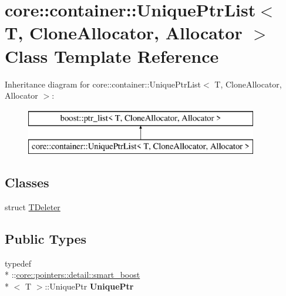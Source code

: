 \hypertarget{classcore_1_1container_1_1_unique_ptr_list}{\section{core\-:\-:container\-:\-:Unique\-Ptr\-List$<$ T, Clone\-Allocator, Allocator $>$ Class Template Reference}
\label{classcore_1_1container_1_1_unique_ptr_list}
}
Inheritance diagram for core\-:\-:container\-:\-:Unique\-Ptr\-List$<$ T, Clone\-Allocator, Allocator $>$\-:\begin{figure}[H]
\begin{center}
\leavevmode
\includegraphics[height=2.000000cm]{classcore_1_1container_1_1_unique_ptr_list}
\end{center}
\end{figure}
\subsection*{Classes}
\begin{DoxyCompactItemize}
\item 
struct \hyperlink{structcore_1_1container_1_1_unique_ptr_list_1_1_t_deleter}{T\-Deleter}
\end{DoxyCompactItemize}
\subsection*{Public Types}
\begin{DoxyCompactItemize}
\item 
\hypertarget{classcore_1_1container_1_1_unique_ptr_list_a0d706a0aa5877aa011bfdfd73c476e7d}{typedef \\*
\-::\hyperlink{structcore_1_1pointers_1_1detail_1_1smart__boost}{core\-::pointers\-::detail\-::smart\-\_\-boost}\\*
$<$ T $>$\-::Unique\-Ptr {\bfseries Unique\-Ptr}}\label{classcore_1_1container_1_1_unique_ptr_list_a0d706a0aa5877aa011bfdfd73c476e7d}

\end{DoxyCompactItemize}
